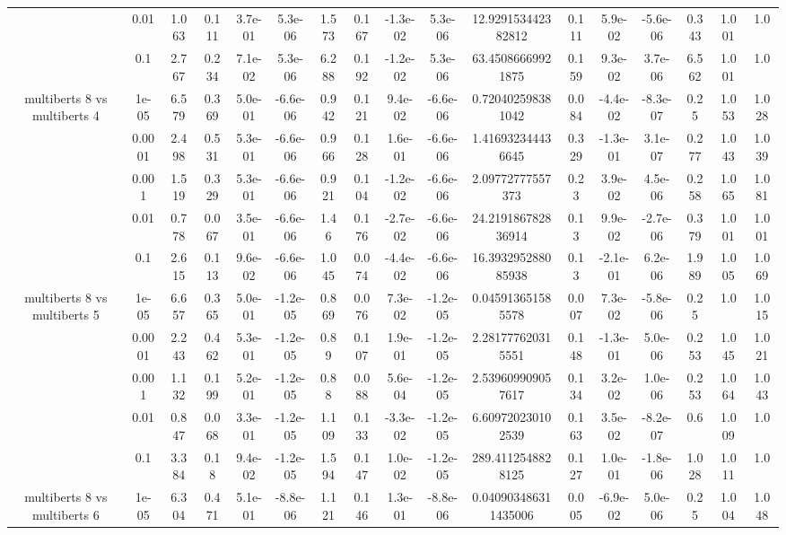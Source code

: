 \begin{tabular}{|c|c|c|c|c|c|c|c|c|c|c|c|c|c|c|c|c|}
 & 0.01 & 1.063 & 0.111 & 3.7e-01 & 5.3e-06 & 1.573 & 0.167 & -1.3e-02 & 5.3e-06 & 12.929153442382812 & 0.111 & 5.9e-02 & -5.6e-06 & 0.343 & 1.001 & 1.0 \\
 & 0.1 & 2.767 & 0.234 & 7.1e-02 & 5.3e-06 & 6.288 & 0.192 & -1.2e-02 & 5.3e-06 & 63.45086669921875 & 0.159 & 9.3e-02 & 3.7e-06 & 6.562 & 1.001 & 1.0 \\
\hline
\multirow{5}{*}{multiberts 8 vs multiberts 4} & 1e-05 & 6.579 & 0.369 & 5.0e-01 & -6.6e-06 & 0.942 & 0.121 & 9.4e-02 & -6.6e-06 & 0.720402598381042 & 0.084 & -4.4e-02 & -8.3e-07 & 0.25 & 1.053 & 1.028 \\
 & 0.0001 & 2.498 & 0.531 & 5.3e-01 & -6.6e-06 & 0.966 & 0.128 & 1.6e-01 & -6.6e-06 & 1.416932344436645 & 0.329 & -1.3e-01 & 3.1e-07 & 0.277 & 1.043 & 1.039 \\
 & 0.001 & 1.519 & 0.329 & 5.3e-01 & -6.6e-06 & 0.921 & 0.104 & -1.2e-02 & -6.6e-06 & 2.09772777557373 & 0.23 & 3.9e-02 & 4.5e-06 & 0.258 & 1.065 & 1.081 \\
 & 0.01 & 0.778 & 0.067 & 3.5e-01 & -6.6e-06 & 1.46 & 0.176 & -2.7e-02 & -6.6e-06 & 24.219186782836914 & 0.13 & 9.9e-02 & -2.7e-06 & 0.379 & 1.001 & 1.001 \\
 & 0.1 & 2.615 & 0.113 & 9.6e-02 & -6.6e-06 & 1.045 & 0.074 & -4.4e-02 & -6.6e-06 & 16.393295288085938 & 0.13 & -2.1e-01 & 6.2e-06 & 1.989 & 1.005 & 1.069 \\
\hline
\multirow{5}{*}{multiberts 8 vs multiberts 5} & 1e-05 & 6.657 & 0.365 & 5.0e-01 & -1.2e-05 & 0.869 & 0.076 & 7.3e-02 & -1.2e-05 & 0.045913651585578 & 0.007 & 7.3e-02 & -5.8e-06 & 0.25 & 1.0 & 1.015 \\
 & 0.0001 & 2.243 & 0.462 & 5.3e-01 & -1.2e-05 & 0.89 & 0.107 & 1.9e-01 & -1.2e-05 & 2.281777620315551 & 0.148 & -1.3e-01 & 5.0e-06 & 0.253 & 1.045 & 1.021 \\
 & 0.001 & 1.132 & 0.199 & 5.2e-01 & -1.2e-05 & 0.88 & 0.088 & 5.6e-04 & -1.2e-05 & 2.539609909057617 & 0.134 & 3.2e-02 & 1.0e-06 & 0.253 & 1.064 & 1.043 \\
 & 0.01 & 0.847 & 0.068 & 3.3e-01 & -1.2e-05 & 1.109 & 0.133 & -3.3e-02 & -1.2e-05 & 6.609720230102539 & 0.163 & 3.5e-02 & -8.2e-07 & 0.6 & 1.009 & 1.0 \\
 & 0.1 & 3.384 & 0.18 & 9.4e-02 & -1.2e-05 & 1.594 & 0.147 & 1.0e-02 & -1.2e-05 & 289.4112548828125 & 0.127 & 1.0e-01 & -1.8e-06 & 1.028 & 1.011 & 1.0 \\
\hline
\multirow{5}{*}{multiberts 8 vs multiberts 6} & 1e-05 & 6.304 & 0.471 & 5.1e-01 & -8.8e-06 & 1.121 & 0.146 & 1.3e-01 & -8.8e-06 & 0.040903486311435006 & 0.005 & -6.9e-02 & 5.0e-06 & 0.25 & 1.004 & 1.048 \\

\end{tabular}
